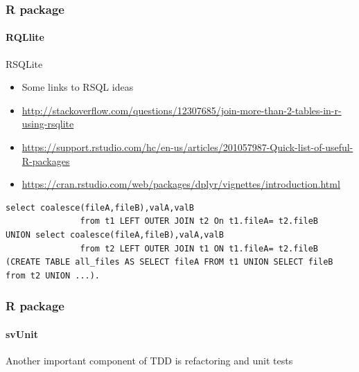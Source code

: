 \documentclass[12pt]{beamer}\usepackage[]{graphicx}\usepackage[]{color}
\begin{document}
\begin{frame}[fragile]
  \frametitle{R package}
  \framesubtitle{RQLlite}
  \begin{block}{RSQLite}
  \begin{itemize}
  \item Some links to RSQL ideas
\item \url{http://stackoverflow.com/questions/12307685/join-more-than-2-tables-in-r-using-rsqlite}
\item \url{https://support.rstudio.com/hc/en-us/articles/201057987-Quick-list-of-useful-R-packages}
\item \url{https://cran.rstudio.com/web/packages/dplyr/vignettes/introduction.html}
\end{itemize}
\end{block}
 \begin{lstlisting}
select coalesce(fileA,fileB),valA,valB
               from t1 LEFT OUTER JOIN t2 On t1.fileA= t2.fileB
UNION select coalesce(fileA,fileB),valA,valB
               from t2 LEFT OUTER JOIN t1 ON t1.fileA= t2.fileB
(CREATE TABLE all_files AS SELECT fileA FROM t1 UNION SELECT fileB from t2 UNION ...).             
 \end{lstlisting}

\end{frame}


\begin{frame}
  \frametitle{R package}
  \framesubtitle{svUnit}
     Another important component of TDD is refactoring and unit tests
\end{frame}




\end{document}
